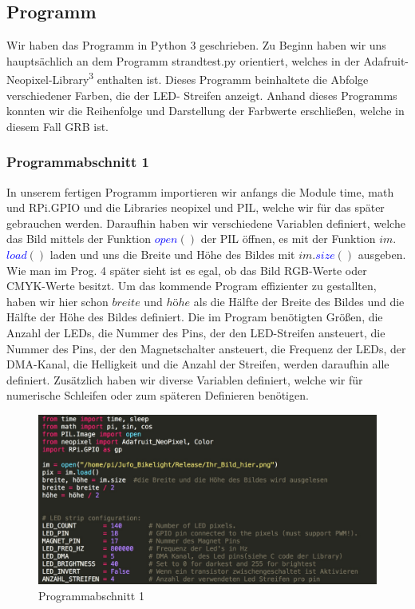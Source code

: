 \documentclass [a4paper, 11pt] {article}
\begin{document}
\subsection{Programm}
Wir haben das Programm in Python 3 geschrieben. Zu Beginn haben wir uns hauptsächlich an dem Programm strandtest.py orientiert, welches in der Adafruit-Neopixel-Library\textsuperscript{3} enthalten ist. Dieses Programm beinhaltete die Abfolge verschiedener Farben, die der LED- Streifen anzeigt. Anhand dieses Programms konnten wir die Reihenfolge und Darstellung der Farbwerte erschließen, welche in diesem Fall GRB ist.
\subsubsection{Programmabschnitt 1}
In unserem fertigen Programm importieren wir anfangs die Module time, math und RPi.GPIO und die Libraries neopixel und PIL, welche wir für das später gebrauchen werden. Daraufhin haben wir verschiedene Variablen definiert, welche das Bild mittels der Funktion \textcolor{blue}{$open$}{$()$} der PIL öffnen, es mit der Funktion {$im.$}\textcolor{blue}{$load$}{$()$} laden und uns die Breite und Höhe des Bildes mit {$im.$}\textcolor{blue}{$size$}{$()$} ausgeben. Wie man im Prog. 4 später sieht ist es egal, ob das Bild RGB-Werte oder CMYK-Werte besitzt. Um das kommende Program effizienter zu gestallten, haben wir hier schon {$breite$} und {$h\text{ö}he$} als die Hälfte der Breite des Bildes und die Hälfte der Höhe des Bildes definiert. Die im Program benötigten Größen, die Anzahl der LEDs, die Nummer des Pins, der den LED-Streifen ansteuert, die Nummer des Pins, der den Magnetschalter ansteuert, die Frequenz der LEDs, der DMA-Kanal, die Helligkeit und die Anzahl der Streifen, werden daraufhin alle definiert. Zusätzlich haben wir diverse Variablen definiert, welche wir für numerische Schleifen oder zum späteren Definieren benötigen.
\begin{figure}[h]
	\centering
	\includegraphics[width=16cm]{P1.png}
	\caption{Programmabschnitt 1}
\end{figure}
\end{document}
